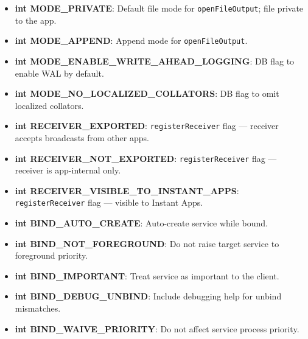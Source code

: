 \documentclass{report}
\begin{document}
\begin{itemize}
\begin{itemize}
                \item \textbf{int MODE\_PRIVATE}: Default file mode for \texttt{openFileOutput}; file private to the app.
                \item \textbf{int MODE\_APPEND}: Append mode for \texttt{openFileOutput}.
                \item \textbf{int MODE\_ENABLE\_WRITE\_AHEAD\_LOGGING}: DB flag to enable WAL by default.
                \item \textbf{int MODE\_NO\_LOCALIZED\_COLLATORS}: DB flag to omit localized collators.
                \item \textbf{int RECEIVER\_EXPORTED}: \texttt{registerReceiver} flag — receiver accepts broadcasts from other apps.
                \item \textbf{int RECEIVER\_NOT\_EXPORTED}: \texttt{registerReceiver} flag — receiver is app-internal only.
                \item \textbf{int RECEIVER\_VISIBLE\_TO\_INSTANT\_APPS}: \texttt{registerReceiver} flag — visible to Instant Apps.

                \item \textbf{int BIND\_AUTO\_CREATE}: Auto-create service while bound.
                \item \textbf{int BIND\_NOT\_FOREGROUND}: Do not raise target service to foreground priority.
                \item \textbf{int BIND\_IMPORTANT}: Treat service as important to the client.
                \item \textbf{int BIND\_DEBUG\_UNBIND}: Include debugging help for unbind mismatches.
                \item \textbf{int BIND\_WAIVE\_PRIORITY}: Do not affect service process priority.
        \end{itemize}


    \end{itemize}

    \pagebreak 
\end{document}
